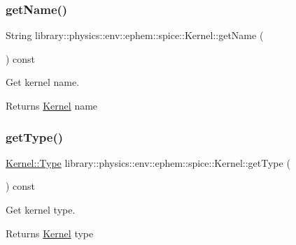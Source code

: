 \subsubsection{\texorpdfstring{get\+Name()}{getName()}}
{\footnotesize\ttfamily String library\+::physics\+::env\+::ephem\+::spice\+::\+Kernel\+::get\+Name (\begin{DoxyParamCaption}{ }\end{DoxyParamCaption}) const}



Get kernel name. 

\begin{DoxyReturn}{Returns}
\hyperlink{classlibrary_1_1physics_1_1env_1_1ephem_1_1spice_1_1_kernel}{Kernel} name 
\end{DoxyReturn}
\mbox{\label{classlibrary_1_1physics_1_1env_1_1ephem_1_1spice_1_1_kernel_afd9f97cd229887921df198a90c23b1be}} 
\subsubsection{\texorpdfstring{get\+Type()}{getType()}}
{\footnotesize\ttfamily \hyperlink{classlibrary_1_1physics_1_1env_1_1ephem_1_1spice_1_1_kernel_ab28fd08b98057f635ee6a0e75b59fae6}{Kernel\+::\+Type} library\+::physics\+::env\+::ephem\+::spice\+::\+Kernel\+::get\+Type (\begin{DoxyParamCaption}{ }\end{DoxyParamCaption}) const}



Get kernel type. 

\begin{DoxyReturn}{Returns}
\hyperlink{classlibrary_1_1physics_1_1env_1_1ephem_1_1spice_1_1_kernel}{Kernel} type 
\end{DoxyReturn}
\mbox{\label{classlibrary_1_1physics_1_1env_1_1ephem_1_1spice_1_1_kernel_a558c4d3b2fd3bf007fa17dd16a4deee3}} 
